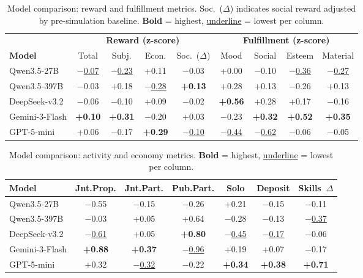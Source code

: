 \begin{table}[t]
\centering
\caption{Model comparison: reward and fulfillment metrics.
Soc.~($\Delta$) indicates social reward adjusted by pre-simulation baseline.
\textbf{Bold} = highest, \underline{underline} = lowest per column.}
\label{tab:model_reward_fulfillment}
\begin{tabular}{l c c c c | c c c c}
\toprule
& \multicolumn{4}{c}{\textbf{Reward (z-score)}}
& \multicolumn{4}{c}{\textbf{Fulfillment (z-score)}} \\
\cmidrule(lr){2-5} \cmidrule(l){6-9}
\textbf{Model} & Total & Subj. & Econ. & Soc.~($\Delta$) & Mood & Social & Esteem & Material \\
\midrule
Qwen3.5-27B      & \underline{$-$0.07} & \underline{$-$0.23} & +0.11 & $-$0.03 & +0.00 & $-$0.10 & \underline{$-$0.36} & \underline{$-$0.27} \\
Qwen3.5-397B     & $-$0.03 & +0.18 & \underline{$-$0.28} & \textbf{+0.13} & +0.28 & +0.13 & $-$0.26 & +0.13 \\
DeepSeek-v3.2    & $-$0.06 & $-$0.10 & +0.09 & $-$0.02 & \textbf{+0.56} & +0.28 & +0.17 & $-$0.16 \\
Gemini-3-Flash   & \textbf{+0.10} & \textbf{+0.31} & $-$0.20 & +0.03 & $-$0.23 & \textbf{+0.32} & \textbf{+0.52} & \textbf{+0.35} \\
GPT-5-mini       & +0.06 & $-$0.17 & \textbf{+0.29} & \underline{$-$0.10} & \underline{$-$0.44} & \underline{$-$0.62} & $-$0.06 & $-$0.05 \\
\bottomrule
\end{tabular}
\end{table}

\begin{table}[t]
\centering
\caption{Model comparison: activity and economy metrics.
\textbf{Bold} = highest, \underline{underline} = lowest per column.}
\label{tab:model_activity_economy}
\begin{tabular}{l c c c c c c}
\toprule
\textbf{Model} & Jnt.Prop. & Jnt.Part. & Pub.Part. & Solo & Deposit & Skills~$\Delta$ \\
\midrule
Qwen3.5-27B      & $-$0.55 & $-$0.15 & $-$0.26 & +0.21 & $-$0.15 & $-$0.11 \\
Qwen3.5-397B     & $-$0.03 & +0.05 & +0.64 & $-$0.28 & $-$0.13 & \underline{$-$0.37} \\
DeepSeek-v3.2    & \underline{$-$0.61} & +0.05 & \textbf{+0.80} & \underline{$-$0.45} & \underline{$-$0.17} & $-$0.06 \\
Gemini-3-Flash   & \textbf{+0.88} & \textbf{+0.37} & \underline{$-$0.96} & +0.19 & +0.07 & $-$0.17 \\
GPT-5-mini       & +0.32 & \underline{$-$0.32} & $-$0.22 & \textbf{+0.34} & \textbf{+0.38} & \textbf{+0.71} \\
\bottomrule
\end{tabular}
\end{table}

